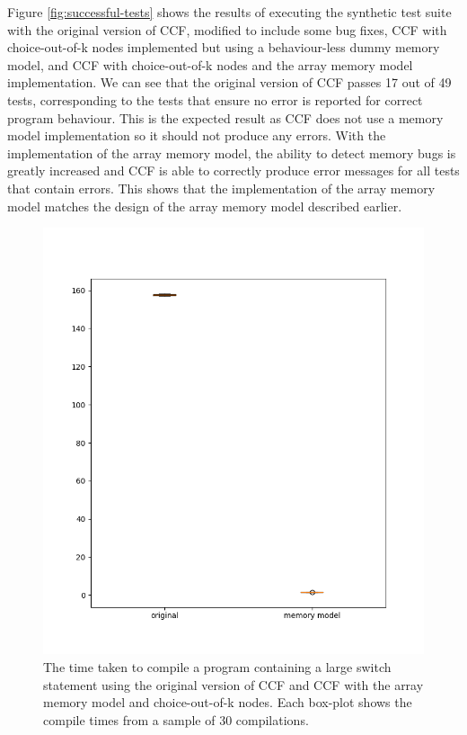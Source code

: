 \documentclass[12pt,twoside]{report}
\begin{document}
Figure \ref{fig:successful-tests} shows the results of executing the synthetic test suite with the original version of CCF, modified to include some bug fixes, CCF with choice-out-of-k nodes implemented but using a behaviour-less dummy memory model, and CCF with choice-out-of-k nodes and the array memory model implementation. We can see that the original version of CCF passes 17 out of 49 tests, corresponding to the tests that ensure no error is reported for correct program behaviour. This is the expected result as CCF does not use a memory model implementation so it should not produce any errors. With the implementation of the array memory model, the ability to detect memory bugs is greatly increased and CCF is able to correctly produce error messages for all tests that contain errors. This shows that the implementation of the array memory model matches the design of the array memory model described earlier.

\begin{figure}
    \centering
    \includegraphics[scale=0.4]{switch-compile-times.png}
    \caption{The time taken to compile a program containing a large switch statement using the original version of CCF and CCF with the array memory model and choice-out-of-k nodes. Each box-plot shows the compile times from a sample of 30 compilations.}
    \label{fig:switch-compile-times-figure}
\end{figure}
\end{document}
